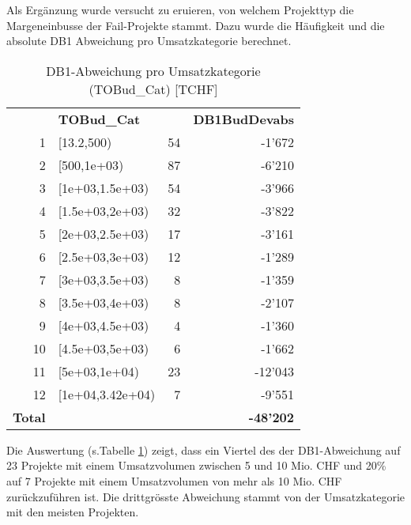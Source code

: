 Als Ergänzung wurde versucht zu eruieren, von welchem Projekttyp die Margeneinbusse der Fail-Projekte stammt. Dazu wurde die Häufigkeit und die absolute DB1 Abweichung pro Umsatzkategorie berechnet.
\begin{table}[H]
	\centering
	\caption{DB1-Abweichung pro Umsatzkategorie (TOBud\_Cat) [TCHF]}
	\begin{tabular}{lrrr}
		& \multicolumn{1}{l}{\textbf{TOBud\_Cat}} &       & \multicolumn{1}{l}{\textbf{DB1BudDevabs}} \\
		\multicolumn{1}{r}{1} & \multicolumn{1}{l}{[13.2,500)} & 54    & -1'672 \\
		\multicolumn{1}{r}{2} & \multicolumn{1}{l}{[500,1e+03)} & 87    & -6'210 \\
		\multicolumn{1}{r}{3} & \multicolumn{1}{l}{[1e+03,1.5e+03)} & 54    & -3'966 \\
		\multicolumn{1}{r}{4} & \multicolumn{1}{l}{[1.5e+03,2e+03)} & 32    & -3'822 \\
		\multicolumn{1}{r}{5} & \multicolumn{1}{l}{[2e+03,2.5e+03)} & 17    & -3'161 \\
		\multicolumn{1}{r}{6} & \multicolumn{1}{l}{[2.5e+03,3e+03)} & 12    & -1'289 \\
		\multicolumn{1}{r}{7} & \multicolumn{1}{l}{[3e+03,3.5e+03)} & 8     & -1'359 \\
		\multicolumn{1}{r}{8} & \multicolumn{1}{l}{[3.5e+03,4e+03)} & 8     & -2'107 \\
		\multicolumn{1}{r}{9} & \multicolumn{1}{l}{[4e+03,4.5e+03)} & 4     & -1'360 \\
		\multicolumn{1}{r}{10} & \multicolumn{1}{l}{[4.5e+03,5e+03)} & 6     & -1'662 \\
		\multicolumn{1}{r}{11} & \multicolumn{1}{l}{[5e+03,1e+04)} & 23    & -12'043 \\
		\multicolumn{1}{r}{12} & \multicolumn{1}{l}{[1e+04,3.42e+04)} & 7     & -9'551 \\
		\textbf{Total} &       &       & \textbf{-48'202} \\
	\end{tabular}%
	\label{ftobudcat}%
\end{table}%
Die Auswertung (s.Tabelle \ref{ftobudcat}) zeigt, dass ein Viertel des der DB1-Abweichung auf 23 Projekte mit einem Umsatzvolumen zwischen 5 und 10 Mio. CHF und 20\% auf 7 Projekte mit einem Umsatzvolumen von mehr als 10 Mio. CHF zurückzuführen ist. Die drittgrösste Abweichung stammt von der Umsatzkategorie mit den meisten Projekten.
